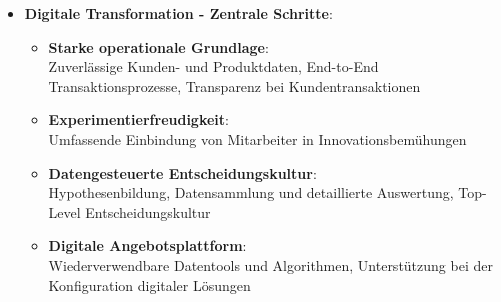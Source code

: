 \documentclass[12pt,a4paper]{article}
\begin{document}
\begin{itemize}
   \item \textbf{Digitale Transformation - Zentrale Schritte}:
      \begin{itemize}
			\item \textbf{Starke operationale Grundlage}: \\
			      Zuverlässige Kunden- und Produktdaten, End-to-End Transaktionsprozesse, Transparenz bei Kundentransaktionen
			\item \textbf{Experimentierfreudigkeit}: \\
			      Umfassende Einbindung von Mitarbeiter in Innovationsbemühungen
			\item \textbf{Datengesteuerte Entscheidungskultur}: \\
			      Hypothesenbildung, Datensammlung und detaillierte Auswertung, Top-Level Entscheidungskultur
			\item \textbf{Digitale Angebotsplattform}: \\
			      Wiederverwendbare Datentools und Algorithmen, Unterstützung bei der Konfiguration digitaler Lösungen
      \end{itemize}
\end{itemize}
\end{document}

